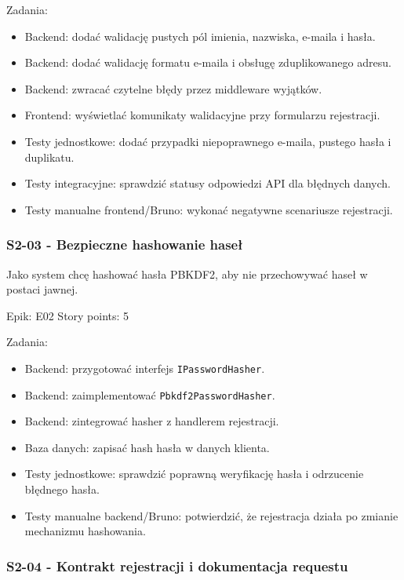 \documentclass[12pt,a4paper]{article}
\begin{document}
Zadania:

\begin{itemize}
\item Backend: dodać walidację pustych pól imienia, nazwiska, e-maila i hasła.
\item Backend: dodać walidację formatu e-maila i obsługę zduplikowanego adresu.
\item Backend: zwracać czytelne błędy przez middleware wyjątków.
\item Frontend: wyświetlać komunikaty walidacyjne przy formularzu rejestracji.
\item Testy jednostkowe: dodać przypadki niepoprawnego e-maila, pustego hasła i duplikatu.
\item Testy integracyjne: sprawdzić statusy odpowiedzi API dla błędnych danych.
\item Testy manualne frontend/Bruno: wykonać negatywne scenariusze rejestracji.
\end{itemize}

\subsubsection*{S2-03 - Bezpieczne hashowanie haseł}

Jako system chcę hashować hasła PBKDF2, aby nie przechowywać haseł w postaci jawnej.

Epik: E02
Story points: 5

Zadania:

\begin{itemize}
\item Backend: przygotować interfejs \texttt{IPasswordHasher}.
\item Backend: zaimplementować \texttt{Pbkdf2PasswordHasher}.
\item Backend: zintegrować hasher z handlerem rejestracji.
\item Baza danych: zapisać hash hasła w danych klienta.
\item Testy jednostkowe: sprawdzić poprawną weryfikację hasła i odrzucenie błędnego hasła.
\item Testy manualne backend/Bruno: potwierdzić, że rejestracja działa po zmianie mechanizmu hashowania.
\end{itemize}

\subsubsection*{S2-04 - Kontrakt rejestracji i dokumentacja requestu}
\end{document}
